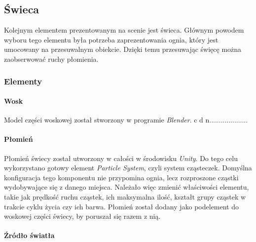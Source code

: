 \subsection{Świeca}
Kolejnym elementem prezentowanym na scenie jest świeca. Głównym powodem wyboru tego elementu była potrzeba zaprezentowania ognia, który jest umocowany na przesuwalnym obiekcie. Dzięki temu przesuwając święcę można zaobserwować ruchy płomienia.

\subsubsection{Elementy}
\paragraph{Wosk}
Model części woskowej został stworzony w programie \textit{Blender}. 
c d n....................

\paragraph{Płomień}
Płomień świecy został utworzony w całości w środowisku \textit{Unity}. Do tego celu wykorzystano gotowy element \textit{Particle System}, czyli system cząsteczek. Domyślna konfiguracja tego komponentu nie przypomina ognia, lecz rozproszone cząstki wydobywające się z danego miejsca. Należało więc zmienić właściwości elementu, takie jak prędkość ruchu cząstek, ich maksymalna ilość, kształt grupy cząstek w trakcie cyklu życia czy ich barwa. Płomień został dodany jako podelement do woskowej części świecy, by poruszał się razem z nią.

\paragraph{Źródło światła}